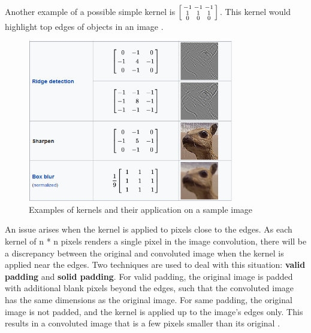 \documentclass[12pt,a4paper,notitlepage]{article}
\begin{document}
Another example of a possible simple kernel is \(\begin{bsmallmatrix}-1 & -1 & -1 \\ 1 & 1 & 1 \\ 0 & 0 & 0\end{bsmallmatrix}\). This kernel would highlight top edges of objects in an image \cite{deep_lizard_convolutional_2017}.

\begin{figure}[htbp]
	\centering
		\includegraphics[width=0.8\textwidth]{images/image-convolutions-examples.png}
	\caption{Examples of kernels and their application on a sample image \cite{wikipedia_collaborators_kernel_2022}}
	\label{fig:image-convolutions-examples}
\end{figure}

An issue arises when the kernel is applied to pixels close to the edges. As each kernel of n * n pixels renders a single pixel in the image convolution, there will be a discrepancy between the original and convoluted image when the kernel is applied near the edges. Two techniques are used to deal with this situation: \textbf{valid padding} and \textbf{solid padding}. For valid padding, the original image is padded with additional blank pixels beyond the edges, such that the convoluted image has the same dimensions as the original image. For same padding, the original image is not padded, and the kernel is applied up to the image's edges only. This results in a convoluted image that is a few pixels smaller than its original \cite{sanderson_convolutions_2020}.
\end{document}
